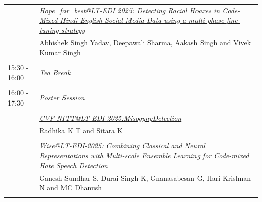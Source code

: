 \documentclass[11pt,oneside]{book}
\begin{document}
\begin{tabular}{p{24mm}p{124mm}}
                      & \hyperlink{page.39}{\emph{Hope\_for\_best@LT-EDI 2025: Detecting Racial Hoaxes in Code-Mixed Hindi-English Social Media Data using a multi-phase fine-tuning strategy}}\\
        & Abhishek Singh Yadav\index{Yadav}, Deepawali Sharma\index{Sharma}, Aakash Singh\index{Singh} and Vivek Kumar Singh\index{Singh}\\\\
                      15:30 - 16:00 & \emph{Tea Break}\\\\
      
                      16:00 - 17:30 & \emph{Poster Session}\\\\
      
                
                      & \hyperlink{page.47}{\emph{CVF-NITT@LT-EDI-2025:MisogynyDetection}}\\
        & Radhika K T\index{T} and Sitara K\index{K}\\\\
                
                      & \hyperlink{page.54}{\emph{Wise@LT-EDI-2025: Combining Classical and Neural Representations with Multi-scale Ensemble Learning for Code-mixed Hate Speech Detection}}\\
        & Ganesh Sundhar S\index{S}, Durai Singh K\index{K}, Gnanasabesan G\index{G}, Hari Krishnan N\index{N} and MC Dhanush\index{Dhanush}\\\\
              \end{tabular}
    \newpage
\end{document}
